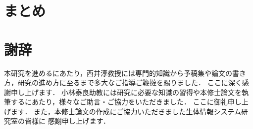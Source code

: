 \documentclass[a4j, 12pt]{jsreport}
\begin{document}
    \chapter{}\label{chap4:high-dimentional_feedback_control_model}
    




    \chapter{まとめ}\label{chap:summary}
    

    \chapter*{謝辞}
    本研究を進めるにあたり，西井淳教授には専門的知識から予稿集や論文の書き方，研究の進め方に至るまで多大なご指導ご鞭撻を賜りました．
    ここに深く感謝申し上げます．
    小林泰良助教には研究に必要な知識の習得や本修士論文を執筆するにあたり，様々なご助言・ご協力をいただきました．
    ここに御礼申し上げます．
    また，本修士論文の作成にご協力いただきました生体情報システム研究室の皆様に
    感謝申し上げます．


    
    
    
\end{document}
